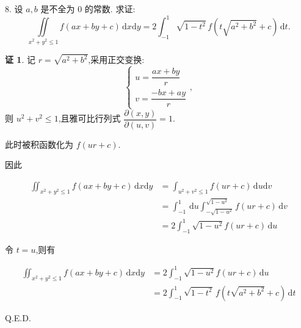 \documentclass[a4paper,12pt]{article}
\theoremstyle{definition}
\newtheorem*{pf}{证}
\begin{document}
8. 设 $a,b$ 是不全为 $0$ 的常数. 求证:
$$
    \iint\limits_{x^2+y^2 \leq 1} f(ax + by + c) \, \mathrm{d}x\mathrm{d}y = 2 \int_{-1}^{1} \sqrt{1-t^2} \, f\left(t\sqrt{a^2+b^2} + c\right) \, \mathrm{d}t.
$$
\begin{pf}
    记 $r=\sqrt{a^2+b^2}$,采用正交变换:
    $$\begin{cases}
        u=\dfrac{ax+by}{r} \\
        v=\dfrac{-bx+ay}{r}
    \end{cases},$$
    则 $u^2+v^2\leq 1$,且雅可比行列式 $\dfrac{\partial(x,y)}{\partial(u,v)}=1$.

    此时被积函数化为 $f(ur+c)$.

    因此

    \begin{align*}
        \iint_{x^2+y^2 \leq 1} f(ax + by + c) \, \mathrm{d}x\mathrm{d}y
         & =\int_{u^2+v^2\leq 1}f(ur+c)\,\mathrm{d}u\mathrm{d}v                             \\
         & =\int_{-1}^1\,\mathrm{d}u\int_{-\sqrt{1-u^2}}^{\sqrt{1-u^2}}f(ur+c)\,\mathrm{d}v \\
         & =2\int_{-1}^1\sqrt{1-u^2}f(ur+c)\,\mathrm{d}u
    \end{align*}

    令 $t=u$,则有

    \begin{align*}
        \iint_{x^2+y^2 \leq 1} f(ax + by + c) \, \mathrm{d}x\mathrm{d}y
         & =2\int_{-1}^1\sqrt{1-u^2}f(ur+c)\,\mathrm{d}u                                     \\
         & =2 \int_{-1}^{1} \sqrt{1-t^2} \, f\left(t\sqrt{a^2+b^2} + c\right) \, \mathrm{d}t
    \end{align*}

    Q.E.D.
\end{pf}
\end{document}
